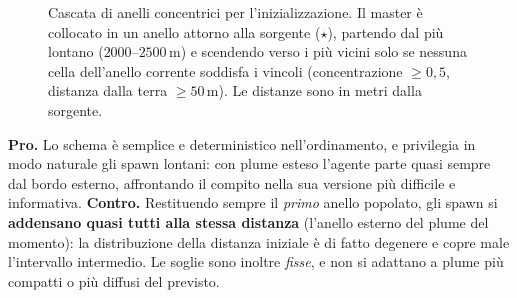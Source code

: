 \begin{figure}[H]
\centering
{}
\caption{Cascata di anelli concentrici per l'inizializzazione. Il master \`e collocato in
         un anello attorno alla sorgente ($\star$), partendo dal pi\`u lontano
         ($2000$--$2500\,\text{m}$) e scendendo verso i pi\`u vicini solo se nessuna cella
         dell'anello corrente soddisfa i vincoli (concentrazione $\geq 0{,}5$, distanza dalla
         terra $\geq 50\,\text{m}$). Le distanze sono in metri dalla sorgente.}
\label{fig:spawn_cascade}
\end{figure}

\textbf{Pro.} Lo schema \`e semplice e deterministico nell'ordinamento, e privilegia in modo
naturale gli spawn lontani: con plume esteso l'agente parte quasi sempre dal bordo esterno,
affrontando il compito nella sua versione pi\`u difficile e informativa.
\textbf{Contro.} Restituendo sempre il \emph{primo} anello popolato, gli spawn si
\textbf{addensano quasi tutti alla stessa distanza} (l'anello esterno del plume del
momento): la distribuzione della distanza iniziale \`e di fatto degenere e copre male
l'intervallo intermedio. Le soglie sono inoltre \emph{fisse}, e non si adattano a plume
pi\`u compatti o pi\`u diffusi del previsto.

